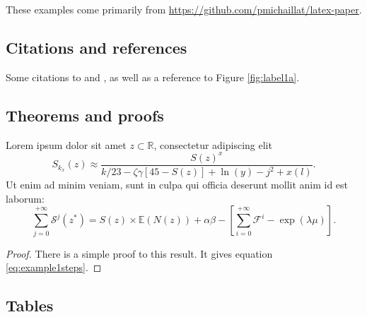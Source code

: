 \documentclass{article}
\begin{document}
These examples come primarily from \url{https://github.com/pmichaillat/latex-paper}.

\subsection{Citations and references}

Some citations to \citep{placeholder-ref1} and \citep{placeholder-ref2}, as well as a reference to Figure \ref{fig:label1a}.

\subsection{Theorems and proofs}

\begin{proposition}\label{prop:example1}  
    Lorem ipsum dolor sit amet $z \subset \mathbb{R}$, consectetur adipiscing elit
    \begin{equation}\label{eq:example1}
        S_{k_x}(z) \approx \frac{S(z)^x}{k / 23 -\zeta\gamma [45- S(z)] + \ln(y) - j^2+x(l)}.
    \end{equation}
    Ut enim ad minim veniam, sunt in culpa qui officia deserunt mollit anim id est laborum:
    \begin{equation}\label{eq:example1steps}
        \sum_{j=0}^{+\infty}\mathcal{S}^j(z^{\ast}) = S(z) \times \mathbb{E}(N(z)) + \alpha \beta - \left[\sum_{i=0}^{+\infty}\mathcal{F}^{i}-\exp(\lambda \mu)\right].
    \end{equation}
\end{proposition}
\begin{proof} 
    There is a simple proof to this result. It gives equation \eqref{eq:example1steps}.
\end{proof} 

\subsection{Tables}
\end{document}
